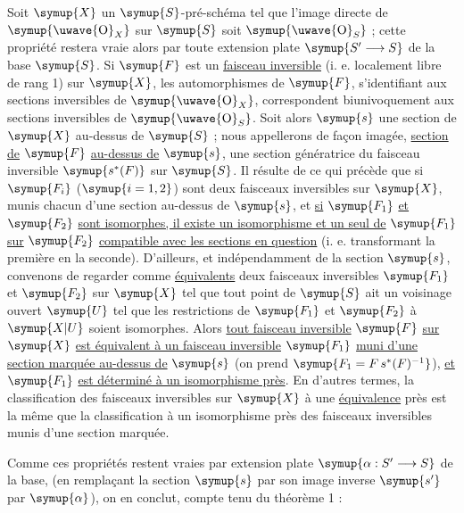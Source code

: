  Soit $\symup{X}$ un $\symup{S}$-pré-schéma tel que l'image directe de $\symup{\text{\uwave{O}}_X}$ sur $\symup{S}$
soit $\symup{\text{\uwave{O}}_S}$ ; cette propriété restera vraie alors par toute extension
plate $\symup{S'\longrightarrow S}$ de la base $\symup{S}$. Si $\symup{F}$ est un \uline{faisceau inversible}
(i. e. localement libre de rang 1) sur $\symup{X}$, les automorphismes de $\symup{F}$,
s'identifiant aux sections inversibles de $\symup{\text{\uwave{O}}_X}$, correspondent
biunivoquement aux sections inversibles de $\symup{\text{\uwave{O}}_S}$. Soit alors $\symup{s}$ une
section de $\symup{X}$ au-dessus de $\symup{S}$ ; nous appellerons de façon imagée, \uline{section de}
$\symup{F}$ \uline{au-dessus de} $\symup{s}$, une section génératrice du faisceau inversible $\symup{s^*(F)}$ sur $\symup{S}$. Il
résulte de ce qui précède que si $\symup{F_i}$ ($\symup{i=1,2}$) sont deux faisceaux inversibles
sur $\symup{X}$, munis chacun d'une section au-dessus de $\symup{s}$, et \uline{si} $\symup{F_1}$ \uline{et} $\symup{F_2}$ \uline{sont
isomorphes, il existe un isomorphisme et un seul de} $\symup{F_1}$ \uline{sur} $\symup{F_2}$ \uline{compatible
avec les sections en question} (i. e. transformant la première en la seconde).
D'ailleurs, et indépendamment de la section $\symup{s}$, convenons de regarder comme
\uline{équivalents} deux faisceaux inversibles $\symup{F_1}$ et $\symup{F_2}$ sur $\symup{X}$ tel que tout
point de $\symup{S}$ ait un voisinage ouvert $\symup{U}$ tel que les restrictions de $\symup{F_1}$ et
$\symup{F_2}$ à $\symup{X|U}$ soient isomorphes. Alors \uline{tout faisceau inversible} $\symup{F}$ \uline{sur} $\symup{X}$ \uline{est
équivalent à un faisceau inversible} $\symup{F_1}$ \uline{muni d'une section marquée au-dessus
de} $\symup{s}$ (on prend $\symup{F_1=F\,s^*(F)^{-1}}$), \uline{et} $\symup{F_1}$ \uline{est déterminé à un
isomorphisme près}. En d'autres termes, la classification des faisceaux
inversibles sur $\symup{X}$ à une \uline{équivalence} près est la même que la classification à
un isomorphisme près des faisceaux inversibles munis d'une section marquée.

Comme ces propriétés restent vraies par extension plate
$\symup{\alpha:S'\longrightarrow S}$ de la base, (en remplaçant la section $\symup{s}$ par son
image inverse $\symup{s'}$ par $\symup{\alpha}$), on en conclut, compte tenu du théorème 1 :

